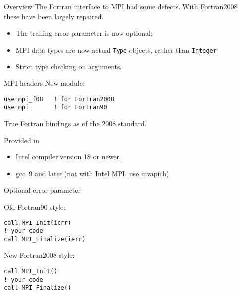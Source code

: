 
\lstset{language=Fortran}
\begin{numberedframe}{Overview}
  The Fortran interface to MPI had some defects.
  With Fortran2008 these have been largely repaired.
  \begin{itemize}
  \item The trailing error parameter is now optional;
  \item MPI data types are now actual \lstinline{Type} objects,
    rather than \lstinline{Integer}
  \item Strict type checking on arguments.
  \end{itemize}
\end{numberedframe}

\begin{numberedframe}{MPI headers}
\label{sl:mpi-header}
New module:
\begin{verbatim}
use mpi_f08   ! for Fortran2008
use mpi       ! for Fortran90
\end{verbatim}
True Fortran bindings as of the 2008 standard.
\begin{tacc}
  Provided in
  \begin{itemize}
  \item
    Intel compiler version 18 or newer,
  \item 
    gcc~9 and later (not with Intel MPI, use mvapich).
  \end{itemize}
\end{tacc}
\end{numberedframe}

\begin{numberedframe}{Optional error parameter}
\lstset{language=Fortran}
\begin{multicols}{2}
  Old Fortran90 style:
\begin{lstlisting}
call MPI_Init(ierr)
! your code
call MPI_Finalize(ierr)
\end{lstlisting}
\columnbreak
New Fortran2008 style:
\begin{lstlisting}
call MPI_Init()
! your code
call MPI_Finalize()
\end{lstlisting}
\end{multicols}
\end{numberedframe}


